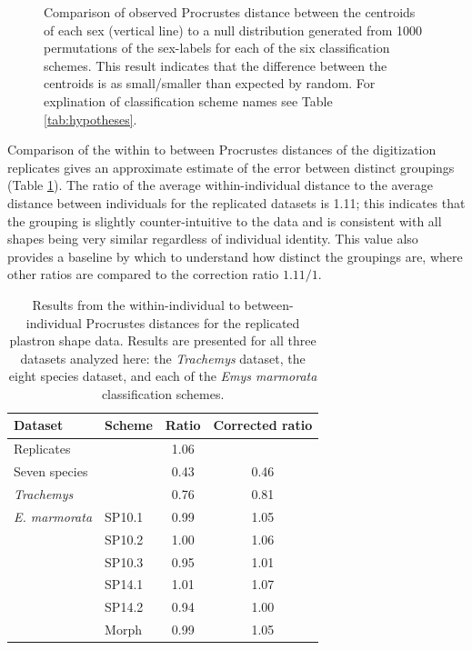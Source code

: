 \documentclass[10pt,letterpaper]{article}
\begin{document}
\begin{figure}[h]
  \centering
  \caption{Comparison of observed Procrustes distance between the centroids of each sex (vertical line) to a null distribution generated from 1000 permutations of the sex-labels for each of the six classification schemes. This result indicates that the difference between the centroids is as small/smaller than expected by random. For explination of classification scheme names see Table \ref{tab:hypotheses}.}
  \label{fig:sex_test_group}
\end{figure}


Comparison of the within to between Procrustes distances of the digitization replicates gives an approximate estimate of the error between distinct groupings (Table \ref{tab:rep_res}). The ratio of the average within-individual distance to the average distance between individuals for the replicated datasets is 1.11; this indicates that the grouping is slightly counter-intuitive to the data and is consistent with all shapes being very similar regardless of individual identity. This value also provides a baseline by which to understand how distinct the groupings are, where other ratios are compared to the correction ratio \(1.11/1\). 

\begin{table}
  \centering
  \caption{Results from the within-individual to between-individual Procrustes distances for the replicated plastron shape data. Results are presented for all three datasets analyzed here: the \textit{Trachemys} dataset, the eight species dataset, and each of the \textit{Emys marmorata} classification schemes.}
  \begin{tabular}{l l c c}
    \textbf{Dataset} & \textbf{Scheme} & \textbf{Ratio} & \textbf{Corrected ratio} \\
    \hline
    Replicates & & 1.06 & \\
    \hline
    Seven species & & 0.43 & 0.46 \\
    \textit{Trachemys} & & 0.76 & 0.81 \\
    \hline
    \textit{E. marmorata} & SP10.1 & 0.99 & 1.05 \\
     & SP10.2 & 1.00 & 1.06 \\
     & SP10.3 & 0.95 & 1.01 \\
     & SP14.1 & 1.01 & 1.07 \\
     & SP14.2 & 0.94 & 1.00 \\
     & Morph & 0.99 & 1.05 \\
    \hline
  \end{tabular}
  \label{tab:rep_res}
\end{table}
\end{document}
